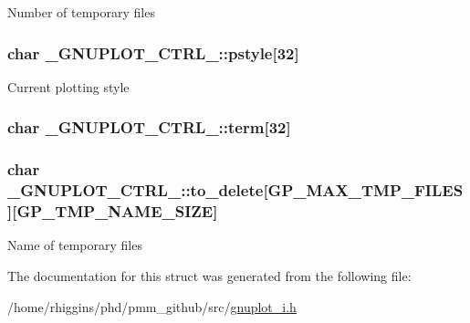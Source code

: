 Number of temporary files \hypertarget{struct__GNUPLOT__CTRL___a469437799a4bf7383bdbabac2590a7ba}{
\subsubsection[{pstyle}]{\setlength{\rightskip}{0pt plus 5cm}char \-\_\-\-G\-N\-U\-P\-L\-O\-T\-\_\-\-C\-T\-R\-L\-\_\-\-::pstyle\mbox{[}32\mbox{]}}}\label{struct__GNUPLOT__CTRL___a469437799a4bf7383bdbabac2590a7ba}
Current plotting style \hypertarget{struct__GNUPLOT__CTRL___a0b75d835feb60e339aa3437aaa5c548a}{
\subsubsection[{term}]{\setlength{\rightskip}{0pt plus 5cm}char \-\_\-\-G\-N\-U\-P\-L\-O\-T\-\_\-\-C\-T\-R\-L\-\_\-\-::term\mbox{[}32\mbox{]}}}\label{struct__GNUPLOT__CTRL___a0b75d835feb60e339aa3437aaa5c548a}
\hypertarget{struct__GNUPLOT__CTRL___a97b62dbc77e2491651700c17c8c25551}{
\subsubsection[{to\-\_\-delete}]{\setlength{\rightskip}{0pt plus 5cm}char \-\_\-\-G\-N\-U\-P\-L\-O\-T\-\_\-\-C\-T\-R\-L\-\_\-\-::to\-\_\-delete\mbox{[}{\bf G\-P\-\_\-\-M\-A\-X\-\_\-\-T\-M\-P\-\_\-\-F\-I\-L\-E\-S}\mbox{]}\mbox{[}{\bf G\-P\-\_\-\-T\-M\-P\-\_\-\-N\-A\-M\-E\-\_\-\-S\-I\-Z\-E}\mbox{]}}}\label{struct__GNUPLOT__CTRL___a97b62dbc77e2491651700c17c8c25551}
Name of temporary files 

The documentation for this struct was generated from the following file\-:\begin{DoxyCompactItemize}
\item 
/home/rhiggins/phd/pmm\-\_\-github/src/\hyperlink{gnuplot__i_8h}{gnuplot\-\_\-i.\-h}\end{DoxyCompactItemize}
